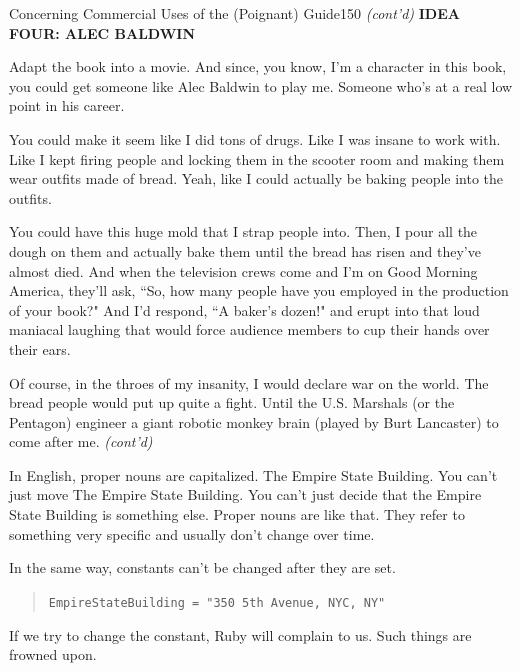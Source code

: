 \documentclass[10pt,twoside]{report}
\begin{document}
	\begin{sidebar}{Concerning Commercial Uses of the (Poignant) Guide}{150}
		\textit{(cont'd)} \textbf{IDEA FOUR: ALEC BALDWIN}\vspace{6pt}
		
		Adapt the book into a movie. And since, you know, I'm a character in this book, you could get someone like Alec Baldwin to play me. Someone who's at a real low point in his career.\vspace{6pt}

		You could make it seem like I did tons of drugs. Like I was insane to work with. Like I kept firing people and locking them in the scooter room and making them wear outfits made of bread. Yeah, like I could actually be baking people into the outfits.\vspace{6pt}

		You could have this huge mold that I strap people into. Then, I pour all the dough on them and actually bake them until the bread has risen and they've almost died. And when the television crews come and I'm on Good Morning America, they'll ask, ``So, how many people have you employed in the production of your book?" And I'd respond, ``A baker's dozen!" and erupt into that loud maniacal laughing that would force audience members to cup their hands over their ears.\vspace{6pt}

		Of course, in the throes of my insanity, I would declare war on the world. The bread people would put up quite a fight. Until the U.S. Marshals (or the Pentagon) engineer a giant robotic monkey brain (played by Burt Lancaster) to come after me. \textit{(cont'd)}
	\end{sidebar}

In English, proper nouns are capitalized.  The Empire State Building.
You can't just move The Empire State Building.  You can't just decide
that the Empire State Building is something else. Proper nouns are
like that.  They refer to something very specific and usually don't
change over time.

In the same way, constants can't be changed after they are set.

\begin{quote}
\lstinline[breaklines=true]|EmpireStateBuilding = "350 5th Avenue, NYC, NY"|\end{quote}


If we try to change the constant, Ruby will complain to us.  Such
things are frowned upon.
\end{document}
